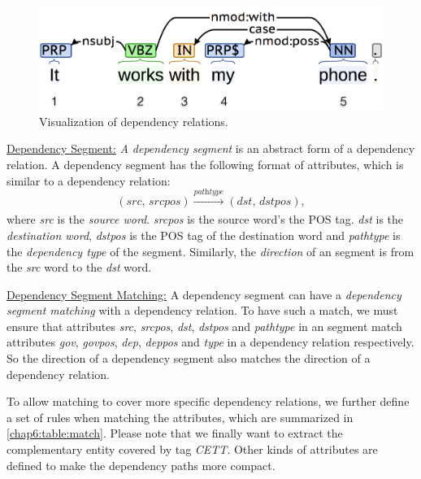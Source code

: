 \begin{figure} %
   \centering
   \includegraphics[width=5.in]{fig/bd16_coreNLP.png} 
   \caption{Visualization of dependency relations.}
   \label{chap6:fig:dt}
\end{figure}

\underline{Dependency Segment:} \label{chap6:defn:seg} 
\emph{A dependency segment} is an abstract form of a dependency relation. A dependency segment has the following format of attributes, which is similar to a dependency relation: 
$$(\textit{src, srcpos})\xrightarrow[]{\textit{pathtype}}(\textit{dst, dstpos}), $$
where \textit{src} is the \textit{source word}.
\textit{srcpos} is the source word's the POS tag.
\textit{dst} is the \textit{destination word}, \textit{dstpos} is the POS tag of the destination word and \textit{pathtype} is the \textit{dependency type} of the segment. Similarly, the \emph{direction} of an segment is from the \textit{src} word to the \textit{dst} word.

\underline{Dependency Segment Matching:} \label{chap6:defn:match} 
A dependency segment can have a \emph{dependency segment matching} with a dependency relation. To have such a match, we must ensure that attributes \textit{src}, \textit{srcpos}, \textit{dst}, \textit{dstpos} and \textit{pathtype} in an segment match attributes \textit{gov}, \textit{govpos}, \textit{dep}, \textit{deppos} and \textit{type} in a dependency relation respectively. So the direction of a dependency segment also matches the direction of a dependency relation.

To allow matching to cover more specific dependency relations, we further define a set of rules when matching the attributes, which are summarized in \ref{chap6:table:match}. Please note that we finally want to extract the complementary entity covered by tag \textit{CETT}. Other kinds of attributes are defined to make the dependency paths more compact.

